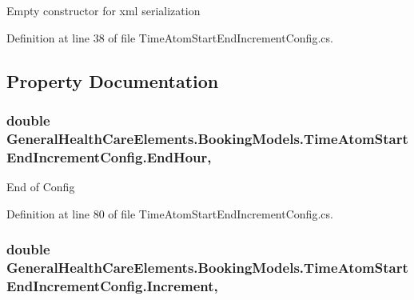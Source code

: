 Empty constructor for xml serialization 



Definition at line 38 of file Time\+Atom\+Start\+End\+Increment\+Config.\+cs.



\subsection{Property Documentation}
\subsubsection[{\texorpdfstring{End\+Hour}{EndHour}}]{\setlength{\rightskip}{0pt plus 5cm}double General\+Health\+Care\+Elements.\+Booking\+Models.\+Time\+Atom\+Start\+End\+Increment\+Config.\+End\+Hour\hspace{0.3cm}{\ttfamily [get]}, {\ttfamily [set]}}\hypertarget{class_general_health_care_elements_1_1_booking_models_1_1_time_atom_start_end_increment_config_a9a42e179977588d655837a80cd962afa}{}\label{class_general_health_care_elements_1_1_booking_models_1_1_time_atom_start_end_increment_config_a9a42e179977588d655837a80cd962afa}


End of Config 



Definition at line 80 of file Time\+Atom\+Start\+End\+Increment\+Config.\+cs.

\subsubsection[{\texorpdfstring{Increment}{Increment}}]{\setlength{\rightskip}{0pt plus 5cm}double General\+Health\+Care\+Elements.\+Booking\+Models.\+Time\+Atom\+Start\+End\+Increment\+Config.\+Increment\hspace{0.3cm}{\ttfamily [get]}, {\ttfamily [set]}}\hypertarget{class_general_health_care_elements_1_1_booking_models_1_1_time_atom_start_end_increment_config_aa4cf3f3118c9d539ee7d25827bb5a040}{}\label{class_general_health_care_elements_1_1_booking_models_1_1_time_atom_start_end_increment_config_aa4cf3f3118c9d539ee7d25827bb5a040}


